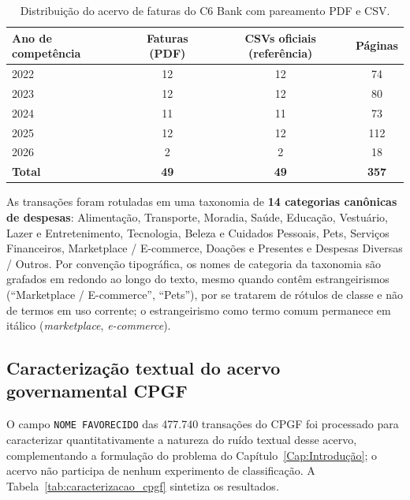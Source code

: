 \begin{table}[htb]
	\centering
	\caption{Distribuição do acervo de faturas do C6 Bank com pareamento PDF e CSV.}
	\label{tab:dataset_c6}
	\begin{tabular}{lccc}
		\toprule
		\textbf{Ano de competência} & \textbf{Faturas (PDF)} & \textbf{CSVs oficiais (referência)} & \textbf{Páginas} \\
		\midrule
		2022 & 12 & 12 & 74 \\
		2023 & 12 & 12 & 80 \\
		2024 & 11 & 11 & 73 \\
		2025 & 12 & 12 & 112 \\
		2026 & \phantom{0}2 & \phantom{0}2 & 18 \\
		\midrule
		\textbf{Total} & \textbf{49} & \textbf{49} & \textbf{357} \\
		\bottomrule
	\end{tabular}
\end{table}

As transações foram rotuladas em uma taxonomia de \textbf{14 categorias canônicas de despesas}: Alimentação, Transporte, Moradia, Saúde, Educação, Vestuário, Lazer e Entretenimento, Tecnologia, Beleza e Cuidados Pessoais, Pets, Serviços Financeiros, Marketplace / E-commerce, Doações e Presentes e Despesas Diversas / Outros. Por convenção tipográfica, os nomes de categoria da taxonomia são grafados em redondo ao longo do texto, mesmo quando contêm estrangeirismos (``Marketplace / E-commerce'', ``Pets''), por se tratarem de rótulos de classe e não de termos em uso corrente; o estrangeirismo como termo comum permanece em itálico (\textit{marketplace}, \textit{e-commerce}).

\subsection{Caracterização textual do acervo governamental CPGF}
\label{sec:val_caracterizacao_cpgf}

O campo \texttt{NOME FAVORECIDO} das 477.740 transações do CPGF foi processado para caracterizar quantitativamente a natureza do ruído textual desse acervo, complementando a formulação do problema do Capítulo~\ref{Cap:Introdução}; o acervo não participa de nenhum experimento de classificação. A Tabela~\ref{tab:caracterizacao_cpgf} sintetiza os resultados.

